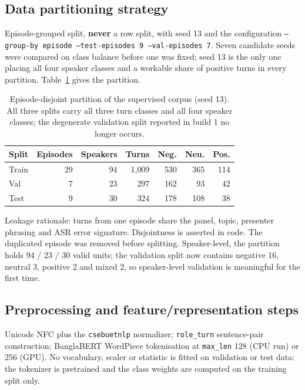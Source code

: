 \documentclass[11pt,a4paper]{article}
\newcommand{\thd}[1]{\textbf{\sffamily\small #1}}          %
\begin{document}
\subsection{Data partitioning strategy}

Episode-grouped split, \textbf{never} a row split, with seed 13 and the configuration
\texttt{--group-by episode --test-episodes 9 --val-episodes 7}. Seven candidate seeds were
compared on class balance before one was fixed; seed 13 is the only one placing all four speaker
classes and a workable share of positive turns in every partition. Table~\ref{tab:partition} gives the partition.

\begin{table}[htbp]\centering
\caption{Episode-disjoint partition of the supervised corpus (seed 13). All three splits carry
all three turn classes and all four speaker classes; the degenerate validation split reported in
build 1 no longer occurs.}\label{tab:partition}
\begin{tabular}{|l|r|r|r|r|r|r|}
\hline
\thd{Split} & \thd{Episodes} & \thd{Speakers} & \thd{Turns} & \thd{Neg.} & \thd{Neu.} & \thd{Pos.} \\ \hline
Train & 29 & 94 & 1{,}009 & 530 & 365 & 114 \\ \hline
Val   & 7  & 23 & 297     & 162 & 93  & 42 \\ \hline
Test  & 9  & 30 & 324     & 178 & 108 & 38 \\ \hline
\end{tabular}
\end{table}

Leakage rationale: turns from one episode share the panel, topic, presenter phrasing and ASR
error signature. Disjointness is asserted in code. The duplicated episode was removed before
splitting. Speaker-level, the partition holds 94 / 23 / 30 valid units; the validation split now
contains negative 16, neutral 3, positive 2 and mixed 2, so speaker-level validation is
meaningful for the first time.

\subsection{Preprocessing and feature/representation steps}

Unicode NFC plus the \texttt{csebuetnlp} normalizer; \texttt{role\_turn} sentence-pair
construction; BanglaBERT WordPiece tokenisation at \texttt{max\_len} 128 (CPU run) or 256 (GPU). No vocabulary, scaler or
statistic is fitted on validation or test data: the tokenizer is pretrained and the class
weights are computed on the training split only.
\end{document}
